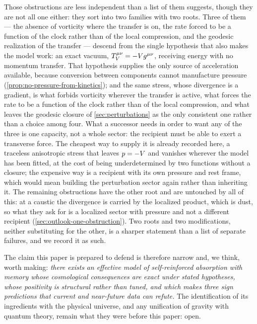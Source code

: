 Those obstructions are less independent than a list of them suggests, though
they are not all one either: they sort into two families with two roots. Three
of them --- the absence of vorticity where the transfer is on, the rate forced
to be a function of the clock rather than of the local compression, and the
geodesic realization of the transfer --- descend from the single hypothesis
that also makes the model work: an exact vacuum,
$T^{\mu\nu}_V=-V g^{\mu\nu}$, receiving energy with no momentum transfer. That hypothesis supplies the only source of acceleration available,
because conversion between components cannot manufacture pressure
(\cref{prop:no-pressure-from-kinetics}); and the same stress, whose divergence
is a gradient, is what forbids vorticity wherever the transfer is active, what
forces the rate to be a function of the clock rather than of the local
compression, and what leaves the geodesic closure of \cref{sec:perturbations}
as the only consistent one rather than a choice among four. What a successor needs in
order to want any of the three is one capacity, not a whole sector: the
recipient must be able to exert a transverse force. The cheapest way to supply
it is already recorded here, a traceless anisotropic stress that leaves
$p=-V$ and vanishes wherever the model has been fitted, at the cost of
being underdetermined by two functions without a closure; the expensive way is
a recipient with its own pressure and rest frame, which would mean building the
perturbation sector again rather than inheriting it. The remaining obstructions
have the other root and are untouched by all of this: at a caustic the
divergence is carried by the localized product, which is dust, so what they
ask for is a localized sector with pressure and not a different recipient
(\cref{sec:outlook-one-obstruction}). Two roots and two modifications, neither
substituting for the other, is a sharper statement than a list of separate
failures, and we record it as such.

The claim this paper is prepared to defend is therefore narrow and, we think,
worth making: \emph{there exists an effective model of self-reinforced
absorption with memory whose cosmological consequences are exact under stated
hypotheses, whose positivity is structural rather than tuned, and which makes
three sign predictions that current and near-future data can refute.} The
identification of its ingredients with the physical universe, and any
unification of gravity with quantum theory, remain what they were before this
paper: open.
